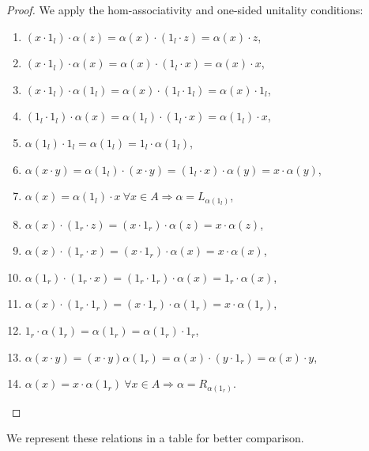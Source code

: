 \documentclass[12pt]{article}
\begin{document}
		\begin{proof}
			We apply the hom-associativity and one-sided unitality conditions:
			\begin{enumerate}[label=\textnormal{(\roman*)}$\colon$,ref=\textnormal{(\roman*)}]
				\item $(x\cdot 1_l)\cdot \alpha(z)=\alpha(x)\cdot (1_l\cdot z)=\alpha(x)\cdot z$,
				\item $(x\cdot 1_l)\cdot \alpha(x)=\alpha(x)\cdot (1_l\cdot x)=\alpha(x)\cdot x$,
				\item $(x\cdot 1_l)\cdot \alpha(1_l)=\alpha(x)\cdot (1_l\cdot 1_l)=\alpha(x)\cdot 1_l$,
				\item $(1_l\cdot 1_l)\cdot \alpha(x)=\alpha(1_l)\cdot (1_l\cdot x)=\alpha(1_l)\cdot x$,
				\item $\alpha(1_l)\cdot 1_l=\alpha(1_l)=1_l\cdot \alpha(1_l)$,
				\item $\alpha(x\cdot y)=\alpha(1_l)\cdot (x\cdot y)=(1_l\cdot x)\cdot \alpha(y)=x\cdot \alpha(y)$,
				\item $\alpha(x)=\alpha(1_l)\cdot x\ \forall x\in A \Rightarrow \alpha=L_{\alpha(1_l)}$,
				\item $\alpha(x)\cdot (1_r\cdot z)=(x\cdot 1_r)\cdot \alpha(z)=x\cdot \alpha(z)$,
				\item $\alpha(x)\cdot (1_r\cdot x)=(x\cdot 1_r)\cdot \alpha(x)=x\cdot \alpha(x)$,
				\item $\alpha(1_r)\cdot (1_r\cdot x)=(1_r\cdot 1_r)\cdot \alpha(x)=1_r\cdot \alpha(x)$,
				\item $\alpha(x)\cdot (1_r\cdot 1_r)=(x\cdot 1_r)\cdot \alpha(1_r)=x\cdot \alpha(1_r)$,
				\item $1_r\cdot \alpha(1_r)=\alpha(1_r)=\alpha(1_r)\cdot 1_r$,
				\item $\alpha(x\cdot y)=(x\cdot y)\alpha(1_r)=\alpha(x)\cdot (y\cdot 1_r)=\alpha(x)\cdot y$,
				\item $\alpha(x)=x\cdot \alpha(1_r)\ \forall x\in A \Rightarrow \alpha=R_{\alpha(1_r)}$.
			\end{enumerate}
		\end{proof}
		We represent these relations in a table for better comparison.
\end{document}
